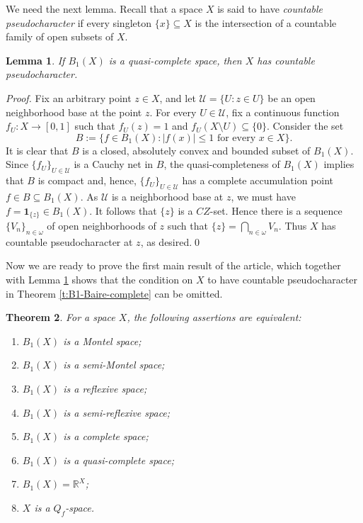 \documentclass[preprint,11pt]{elsarticle}
\newtheorem{theorem}{Theorem}[section]
\newtheorem{lemma}[theorem]{Lemma}
\numberwithin{equation}{section}
\numberwithin{theorem}{section}
\newcommand{\w}{\omega}
\newcommand{\IR}{\mathbb{R}}
\newcommand{\UU}{\mathcal{U}}
\newcommand{\SM}{{\setminus}}
\begin{document}
We need the next lemma. Recall that a space $X$ is said to have {\em countable pseudocharacter} if every singleton $\{x\}\subseteq X$ is the intersection of a countable family of open subsets of $X$.
\begin{lemma} \label{l:B1-qc}
If $B_1(X)$ is a quasi-complete space, then $X$ has countable pseudocharacter.
\end{lemma}
\begin{proof}
Fix an arbitrary point $z\in X$, and let $\UU=\{U: z\in U\}$ be an open neighborhood base at the point $z$. For every $U\in\UU$, fix a continuous function $f_U:X\to [0,1]$ such that $f_U(z)=1$ and $f_U(X\SM U) \subseteq \{0\}$. Consider the set
\[
B:=\{ f\in B_1(X): |f(x)|\leq 1 \mbox{ for every } x\in X\}.
\]
It is clear that $B$ is a closed, absolutely convex and bounded subset of $B_1(X)$. Since $\{f_U\}_{U\in\UU}$ is a Cauchy net in $B$, the quasi-completeness of $B_1(X)$ implies that $B$ is compact and, hence, $\{f_U\}_{U\in\UU}$ has a complete accumulation point $f\in B\subseteq B_1(X)$. As $\UU$ is a neighborhood base at $z$, we must have $f=\mathbf{1}_{\{z\}}\in B_1(X)$. It follows that $\{z\}$ is a $CZ$-set. Hence there is a sequence $\{V_n\}_{n\in\w}$ of open neighborhoods of $z$ such that $\{z\}=\bigcap_{n\in\w} V_n$. Thus $X$ has countable pseudocharacter at $z$, as desired.\qed
\end{proof}


Now we are ready to prove the first main result of the article, which
 together with Lemma \ref{l:B1-qc} shows that the condition on $X$ to have countable pseudocharacter in Theorem \ref{t:B1-Baire-complete} can be omitted.
\begin{theorem} \label{t:B1-quasi-complete}
For a space $X$, the following assertions are equivalent:
\begin{enumerate}
\item[{\rm(i)}] $B_1(X)$ is a Montel space;
\item[{\rm(ii)}] $B_1(X)$ is a semi-Montel space;
\item[{\rm(iii)}] $B_1(X)$ is a reflexive space;
\item[{\rm(iv)}] $B_1(X)$ is a semi-reflexive space;
\item[{\rm(v)}] $B_1(X)$ is a complete space;
\item[{\rm(vi)}] $B_1(X)$ is a quasi-complete space;
\item[{\rm(vii)}] $B_1(X)=\IR^X$;
\item[{\rm(viii)}] $X$ is a $Q_f$-space.
\end{enumerate}
\end{theorem}
\end{document}
